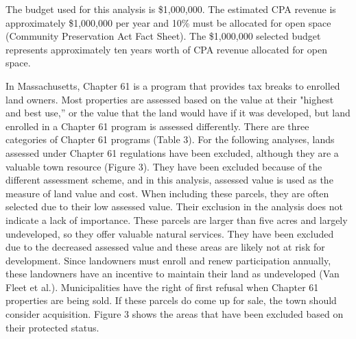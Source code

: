 \documentclass[12pt, stu, floatsintext,table]{apa7}
\begin{document}
The budget used for this analysis is \$1,000,000. The estimated CPA revenue is approximately \$1,000,000 per year and 10\% must be allocated for open space (Community Preservation Act Fact Sheet). The \$1,000,000 selected budget represents approximately ten years worth of CPA revenue allocated for open space. 

\begin{table}[htbp]
\centering
  \caption{Types of land protection and examples in Franklin, MA. Most land is categorized as protected in perpetuity. This is land that is legally protected and often owned by the municipality or state. Land protected in a limited status is legally protected, but not in perpetuity.}
\end{table}
In Massachusetts, Chapter 61 is a program that provides tax breaks to enrolled land owners. Most properties are assessed based on the value at their "highest and best use,” or the value that the land would have if it was developed, but land enrolled in a Chapter 61 program is assessed differently. There are three categories of Chapter 61 programs (Table 3). For the following analyses, lands assessed under Chapter 61 regulations have been excluded, although they are a valuable town resource (Figure 3). They have been excluded because of the different assessment scheme, and in this analysis, assessed value is used as the measure of land value and cost. When including these parcels, they are often selected due to their low assessed value. Their exclusion in the analysis does not indicate a lack of importance. These parcels are larger than five acres and largely undeveloped, so they offer valuable natural services. They have been excluded due to the decreased assessed value and these areas are likely not at risk for development. Since landowners must enroll and renew participation annually, these landowners have an incentive to maintain their land as undeveloped (Van Fleet et al.). Municipalities have the right of first refusal when Chapter 61 properties are being sold. If these parcels do come up for sale, the town should consider acquisition. Figure 3 shows the areas that have been excluded based on their protected status. 
\end{document}
